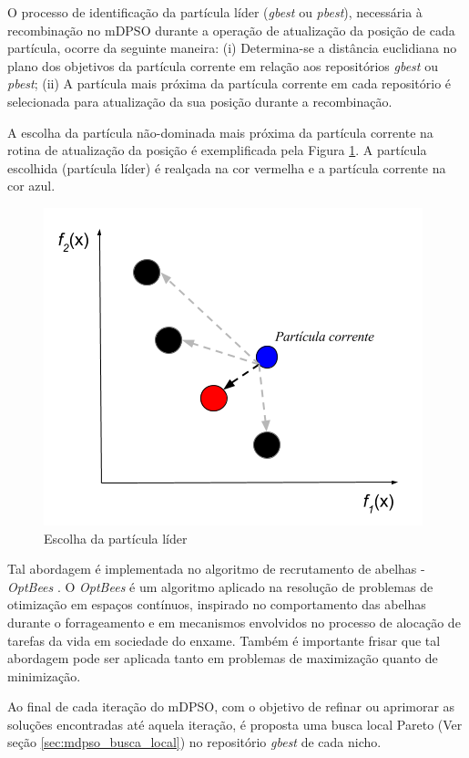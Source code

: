 \documentclass[
	12pt,				%
	openany,			%
	oneside,	
	a4paper,			%
	brazil,				%
	]{unimontes-ppgmsc-abntex2}
\begin{document}
O processo de identificação da partícula líder ({\em gbest} ou {\em pbest}), necessária à recombinação no mDPSO durante a operação de atualização da posição de cada partícula, ocorre da seguinte maneira: (i) Determina-se a distância euclidiana no plano dos objetivos da partícula corrente em relação aos repositórios {\em gbest} ou {\em pbest}; (ii) A partícula mais próxima da partícula corrente em cada repositório é selecionada para atualização da sua posição durante a recombinação. 

A escolha da partícula não-dominada  mais próxima da partícula corrente na rotina de atualização da posição é exemplificada pela Figura \ref{fig:sel_lider}. A partícula escolhida (partícula líder) é realçada na cor vermelha e a partícula corrente na cor azul.

\begin{figure}[ht]
\centering
\includegraphics[scale=.5]{img/best}
\caption{Escolha da partícula líder}
\label{fig:sel_lider}
\end{figure}


Tal abordagem é implementada no algoritmo de recrutamento de abelhas - {\em OptBees} \cite{Renato_2012}. O {\em OptBees} é um algoritmo aplicado na resolução de problemas de otimização em espaços contínuos, inspirado no comportamento das abelhas durante o forrageamento e em mecanismos envolvidos no processo de alocação de tarefas da vida em sociedade do enxame. Também é importante frisar que tal abordagem pode ser aplicada tanto em problemas de maximização quanto de minimização.

Ao final de cada iteração do mDPSO, com o objetivo de refinar ou aprimorar as soluções encontradas até aquela iteração, é proposta uma busca local Pareto (Ver seção \ref{sec:mdpso_busca_local}) no repositório {\em gbest} de cada nicho.
\end{document}
